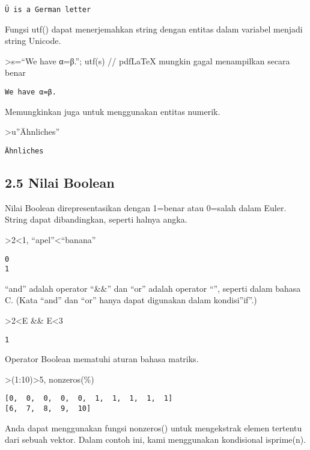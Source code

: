 \documentclass[
]{book}
\begin{document}
\begin{verbatim}
Ü is a German letter
\end{verbatim}

Fungsi utf() dapat menerjemahkan string dengan entitas dalam variabel menjadi string Unicode.

\textgreater s=``We have α=β.''; utf(s) // pdfLaTeX mungkin gagal menampilkan secara benar

\begin{verbatim}
We have α=β.
\end{verbatim}

Memungkinkan juga untuk menggunakan entitas numerik.

\textgreater u''Ähnliches''

\begin{verbatim}
Ähnliches
\end{verbatim}

\subsection{2.5 Nilai Boolean}\label{nilai-boolean}

Nilai Boolean direpresentasikan dengan 1=benar atau 0=salah dalam Euler. String dapat dibandingkan, seperti halnya angka.

\textgreater2\textless1, ``apel''\textless{}``banana''

\begin{verbatim}
0
1
\end{verbatim}

``and'' adalah operator ``\&\&'' dan ``or'' adalah operator ``\textbar\textbar{}'', seperti dalam bahasa C. (Kata ``and'' dan ``or'' hanya dapat digunakan dalam kondisi''if''.)

\textgreater2\textless E \&\& E\textless3

\begin{verbatim}
1
\end{verbatim}

Operator Boolean mematuhi aturan bahasa matriks.

\textgreater(1:10)\textgreater5, nonzeros(\%)

\begin{verbatim}
[0,  0,  0,  0,  0,  1,  1,  1,  1,  1]
[6,  7,  8,  9,  10]
\end{verbatim}

Anda dapat menggunakan fungsi nonzeros() untuk mengekstrak elemen tertentu dari sebuah vektor. Dalam contoh ini, kami menggunakan kondisional isprime(n).
\end{document}
